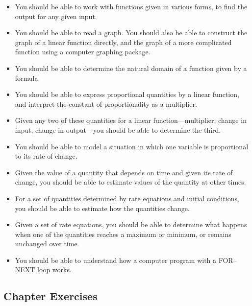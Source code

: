 \begin{itemize}  

\item You should be able to work with functions given in various
  forms, to find the output for any given input.

\item You should be able to read a graph.  You should also be able to
  construct the graph of a linear function directly, and the graph of
  a more complicated function using a computer graphing package.

\item You should be able to determine the natural domain of a function
  given by a formula.

\item You should be able to express proportional quantities by a
  linear function, and interpret the constant of proportionality as a
  multiplier.

\item Given any two of these quantities for a linear
  function---multiplier, change in input, change in output---you
  should be able to determine the third.

\item You should be able to model a situation in which one variable is
  proportional to its rate of change.

\item Given the value of a quantity that depends on time and given its
  rate of change, you should be able to estimate values of the
  quantity at other times.

\item For a set of quantities determined by rate equations and initial
  conditions, you should be able to estimate how the quantities
  change.

\item Given a set of rate equations, you should be able to determine
  what happens when one of the quantities reaches a maximum or
  minimum, or remains unchanged over time.

\item You should be able to understand how a computer program with a
  FOR--NEXT loop works.

\end{itemize}


\subsection{Chapter Exercises}
\label{subsec:chapter-exercises}

